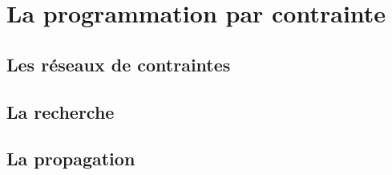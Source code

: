 \section{La programmation par contrainte}

\subsection{Les réseaux de contraintes}

\subsection{La recherche}
\label{sec:PPC_rech}

\subsection{La propagation}
\label{sec:PPC_propag}

